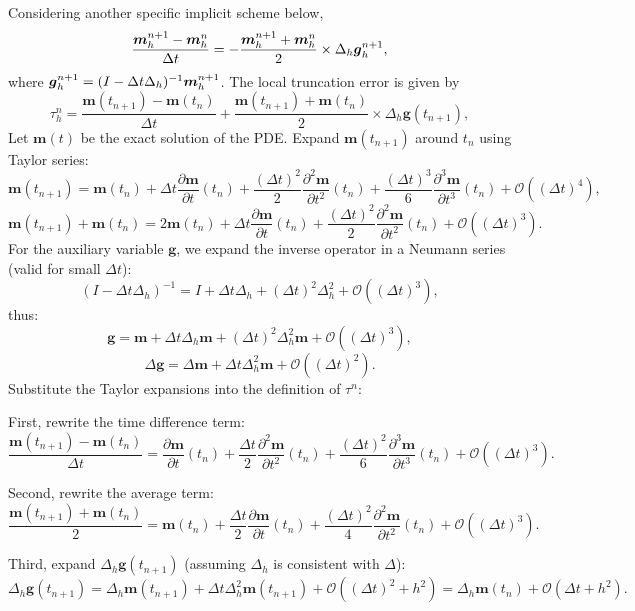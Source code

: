 \documentclass[preprint,times,3p]{elsarticle}
\def\g{\mbox{\boldmath $g$}}
\def\m{\mbox{\boldmath $m$}}
\begin{document}
Considering another specific implicit scheme below,
\begin{align}\label{eq-im}
    \frac{\m_h^{n+1}-\m_h^n}{\Delta t}=-\frac{\m_h^{n+1}+\m_h^n}{2}\times \Delta_h \g_h^{n+1},
\end{align}
where $\g_h^{n+1}=(I-\Delta t \Delta_h)^{-1}\m_h^{n+1}$.
The local truncation error is given by
\[
\tau_h^n = \frac{\boldsymbol{m}(t_{n+1}) - \boldsymbol{m}(t_n)}{\Delta t} + \frac{\boldsymbol{m}(t_{n+1}) + \boldsymbol{m}(t_n)}{2} \times \Delta_h \boldsymbol{g}(t_{n+1}),
\]
Let $\boldsymbol{m}(t)$ be the exact solution of the PDE. Expand $\boldsymbol{m}(t_{n+1})$ around $t_n$ using Taylor series:
\[
\boldsymbol{m}(t_{n+1}) = \boldsymbol{m}(t_n) + \Delta t \frac{\partial \boldsymbol{m}}{\partial t}(t_n) + \frac{(\Delta t)^2}{2} \frac{\partial^2 \boldsymbol{m}}{\partial t^2}(t_n) + \frac{(\Delta t)^3}{6} \frac{\partial^3 \boldsymbol{m}}{\partial t^3}(t_n) + \mathcal{O}((\Delta t)^4),
\]
\[
\boldsymbol{m}(t_{n+1}) + \boldsymbol{m}(t_n) = 2\boldsymbol{m}(t_n) + \Delta t \frac{\partial \boldsymbol{m}}{\partial t}(t_n) + \frac{(\Delta t)^2}{2} \frac{\partial^2 \boldsymbol{m}}{\partial t^2}(t_n) + \mathcal{O}((\Delta t)^3).
\]
For the auxiliary variable $\boldsymbol{g}$, we expand the inverse operator in a Neumann series (valid for small $\Delta t$):
\[
(I - \Delta t \Delta_h)^{-1} = I + \Delta t \Delta_h + (\Delta t)^2 \Delta_h^2 + \mathcal{O}((\Delta t)^3),
\]
thus:
\[
\boldsymbol{g} = \boldsymbol{m} + \Delta t \Delta_h \boldsymbol{m} + (\Delta t)^2 \Delta_h^2 \boldsymbol{m} + \mathcal{O}((\Delta t)^3),
\]
\[
\Delta \boldsymbol{g} = \Delta \boldsymbol{m} + \Delta t \Delta_h^2 \boldsymbol{m} + \mathcal{O}((\Delta t)^2).
\]
Substitute the Taylor expansions into the definition of $\tau^n$:

First, rewrite the time difference term:
\[
\frac{\boldsymbol{m}(t_{n+1}) - \boldsymbol{m}(t_n)}{\Delta t} = \frac{\partial \boldsymbol{m}}{\partial t}(t_n) + \frac{\Delta t}{2} \frac{\partial^2 \boldsymbol{m}}{\partial t^2}(t_n) + \frac{(\Delta t)^2}{6} \frac{\partial^3 \boldsymbol{m}}{\partial t^3}(t_n) + \mathcal{O}((\Delta t)^3).
\]

Second, rewrite the average term:
\[
\frac{\boldsymbol{m}(t_{n+1}) + \boldsymbol{m}(t_n)}{2} = \boldsymbol{m}(t_n) + \frac{\Delta t}{2} \frac{\partial \boldsymbol{m}}{\partial t}(t_n) + \frac{(\Delta t)^2}{4} \frac{\partial^2 \boldsymbol{m}}{\partial t^2}(t_n) + \mathcal{O}((\Delta t)^3).
\]

Third, expand $\Delta_h \boldsymbol{g}(t_{n+1})$ (assuming $\Delta_h$ is consistent with $\Delta$):
\[
\Delta_h \boldsymbol{g}(t_{n+1}) = \Delta_h \boldsymbol{m}(t_{n+1}) + \Delta t \Delta_h^2 \boldsymbol{m}(t_{n+1}) + \mathcal{O}((\Delta t)^2+h^2) = \Delta_h \boldsymbol{m}(t_n)  + \mathcal{O}(\Delta t+h^2).
\]
\end{document}
